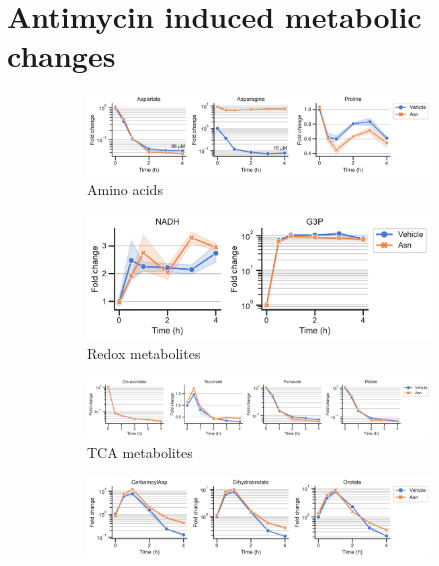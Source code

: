 \newpage
\section{Antimycin induced metabolic changes}
\begin{figure}[ht!]
    \captionsetup{labelformat=empty}
    \centering
    \begin{subfigure}[b]{0.63\textwidth}
        \includegraphics[width=\textwidth]{figures/chap2/app/HT1080_Anti_AA.pdf}
        \caption{Amino acids}
        \label{fig:app_ch2:HT1080_Anti_AA}
    \end{subfigure}
    \hfill
    \begin{subfigure}[b]{0.43\textwidth}
        \includegraphics[width=\textwidth]{figures/chap2/app/HT1080_Anti_rd.pdf}
        \caption{Redox metabolites}
        \label{fig:app_ch2:HT1080_Anti_rd}
    \end{subfigure}
    \hfill
    \begin{subfigure}[b]{0.85\textwidth}
        \includegraphics[width=\textwidth]{figures/chap2/app/HT1080_Anti_tca.pdf}
        \caption{TCA metabolites}
        \label{fig:app_ch2:HT1080_Anti_tca}
    \end{subfigure}
    \hfill
    \begin{subfigure}[b]{0.63\textwidth}
        \includegraphics[width=\textwidth]{figures/chap2/app/HT1080_Anti_pyr.pdf}

\end{subfigure}
\end{figure}
